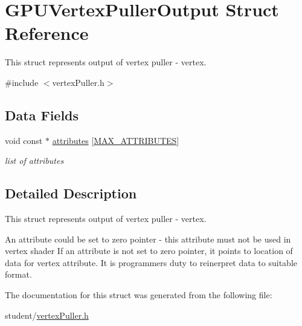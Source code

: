 \hypertarget{structGPUVertexPullerOutput}{}\section{G\+P\+U\+Vertex\+Puller\+Output Struct Reference}
\label{structGPUVertexPullerOutput}


This struct represents output of vertex puller -\/ vertex.  




{\ttfamily \#include $<$vertex\+Puller.\+h$>$}

\subsection*{Data Fields}
\begin{DoxyCompactItemize}
\item 
void const $\ast$ \hyperlink{structGPUVertexPullerOutput_aea734793f0b20b263d90d9abaf582fe5}{attributes} \mbox{[}\hyperlink{fwd_8h_a4d992a1f9192388588184753115f6c03}{M\+A\+X\+\_\+\+A\+T\+T\+R\+I\+B\+U\+T\+ES}\mbox{]}\hypertarget{structGPUVertexPullerOutput_aea734793f0b20b263d90d9abaf582fe5}{}\label{structGPUVertexPullerOutput_aea734793f0b20b263d90d9abaf582fe5}

\begin{DoxyCompactList}\small\item\em list of attributes \end{DoxyCompactList}\end{DoxyCompactItemize}


\subsection{Detailed Description}
This struct represents output of vertex puller -\/ vertex. 

An attribute could be set to zero pointer -\/ this attribute must not be used in vertex shader If an attribute is not set to zero pointer, it points to location of data for vertex attribute. It is programmers duty to reinerpret data to suitable format. 

The documentation for this struct was generated from the following file\+:\begin{DoxyCompactItemize}
\item 
student/\hyperlink{vertexPuller_8h}{vertex\+Puller.\+h}\end{DoxyCompactItemize}
